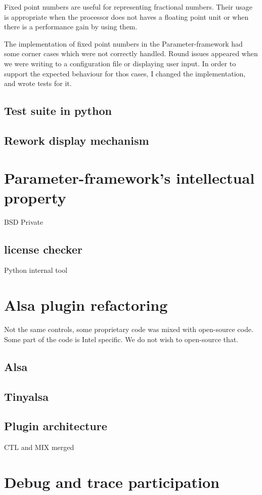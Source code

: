 Fixed point numbers are useful for representing fractional numbers. Their usage
is appropriate when the processor does not haves a floating point unit or when
there is a performance gain by using them.

The implementation of fixed point numbers in the Parameter-framework had some
corner cases which were not correctly handled. Round issues appeared when we
were writing to a configuration file or displaying user input. In order to
support the expected behaviour for thos cases, I changed the implementation, and
wrote tests for it.

\subsection{Test suite in python}
\subsection{Rework display mechanism}

\section{Parameter-framework's intellectual property}
BSD
Private
\subsection{license checker}
Python internal tool

\section{Alsa plugin refactoring}
Not the same controls, some proprietary code was mixed with open-source code.
Some part of the code is Intel specific. We do not wish to open-source that.

\subsection{Alsa}
\subsection{Tinyalsa}
\subsection{Plugin architecture}
CTL and MIX merged

\section{Debug and trace participation}

